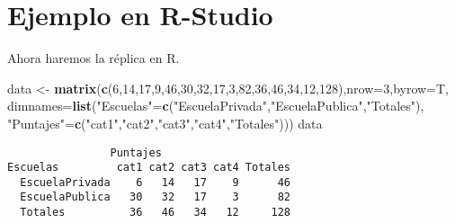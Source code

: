 \documentclass[a4paper,oneside,openany]{book}
\newenvironment{Shaded}{\begin{snugshade}}{\end{snugshade}}
\newcommand{\KeywordTok}[1]{\textcolor[rgb]{0.13,0.29,0.53}{\textbf{#1}}}
\newcommand{\DataTypeTok}[1]{\textcolor[rgb]{0.13,0.29,0.53}{#1}}
\newcommand{\DecValTok}[1]{\textcolor[rgb]{0.00,0.00,0.81}{#1}}
\newcommand{\StringTok}[1]{\textcolor[rgb]{0.31,0.60,0.02}{#1}}
\newcommand{\NormalTok}[1]{#1}
\begin{document}
\section{Ejemplo en R-Studio}\label{ejemplo-en-r-studio-11}

Ahora haremos la réplica en R.

\begin{Shaded}
\begin{Highlighting}[]
\NormalTok{data <-}\StringTok{ }\KeywordTok{matrix}\NormalTok{(}\KeywordTok{c}\NormalTok{(}\DecValTok{6}\NormalTok{,}\DecValTok{14}\NormalTok{,}\DecValTok{17}\NormalTok{,}\DecValTok{9}\NormalTok{,}\DecValTok{46}\NormalTok{,}\DecValTok{30}\NormalTok{,}\DecValTok{32}\NormalTok{,}\DecValTok{17}\NormalTok{,}\DecValTok{3}\NormalTok{,}\DecValTok{82}\NormalTok{,}\DecValTok{36}\NormalTok{,}\DecValTok{46}\NormalTok{,}\DecValTok{34}\NormalTok{,}\DecValTok{12}\NormalTok{,}\DecValTok{128}\NormalTok{),}\DataTypeTok{nrow=}\DecValTok{3}\NormalTok{,}\DataTypeTok{byrow=}\NormalTok{T, }
               \DataTypeTok{dimnames=}\KeywordTok{list}\NormalTok{(}\StringTok{"Escuelas"}\NormalTok{=}\KeywordTok{c}\NormalTok{(}\StringTok{"EscuelaPrivada"}\NormalTok{,}\StringTok{"EscuelaPublica"}\NormalTok{,}\StringTok{"Totales"}\NormalTok{), }
                             \StringTok{"Puntajes"}\NormalTok{=}\KeywordTok{c}\NormalTok{(}\StringTok{"cat1"}\NormalTok{,}\StringTok{"cat2"}\NormalTok{,}\StringTok{"cat3"}\NormalTok{,}\StringTok{"cat4"}\NormalTok{,}\StringTok{"Totales"}\NormalTok{)))}
\NormalTok{data}
\end{Highlighting}
\end{Shaded}

\begin{verbatim}
                Puntajes
Escuelas         cat1 cat2 cat3 cat4 Totales
  EscuelaPrivada    6   14   17    9      46
  EscuelaPublica   30   32   17    3      82
  Totales          36   46   34   12     128
\end{verbatim}
\end{document}
